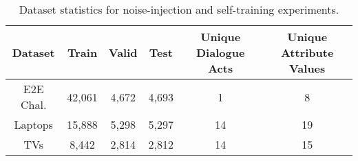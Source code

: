 \begin{table}
\centering
\begin{tabular}{ccc ccc}
\toprule
Dataset & Train & Valid & Test & Unique Dialogue Acts & Unique Attribute Values \\
\midrule
E2E Chal. & 42,061 & 4,672 & 4,693 & 1 & 8 \\
Laptops & 15,888 & 5,298 & 5,297 & 14 & 19\\
TVs & \phantom{0}8,442 & 2,814 & 2,812 & 14 & 15\\
\bottomrule
\end{tabular}
\caption{Dataset statistics for noise-injection and self-training 
experiments.}
\label{tab:fgds}
\end{table}
